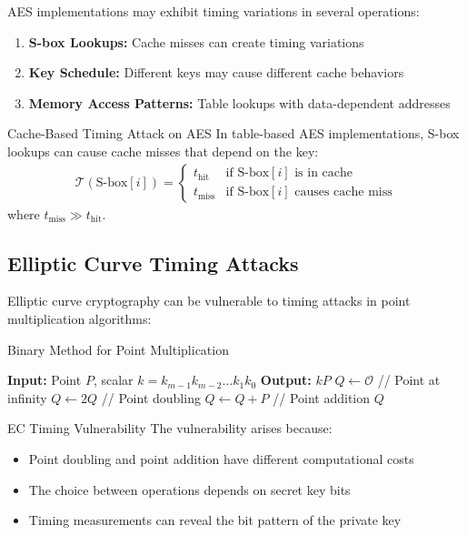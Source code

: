 \documentclass[12pt,a4paper]{article}
\theoremstyle{definition}
\newcommand{\time}[1]{\mathcal{T}\left(#1\right)}
\begin{document}
AES implementations may exhibit timing variations in several operations:

\begin{enumerate}
    \item \textbf{S-box Lookups:} Cache misses can create timing variations
    \item \textbf{Key Schedule:} Different keys may cause different cache behaviors
    \item \textbf{Memory Access Patterns:} Table lookups with data-dependent addresses
\end{enumerate}

\begin{definitionbox}{Cache-Based Timing Attack on AES}
In table-based AES implementations, S-box lookups can cause cache misses that depend on the key:
\begin{align}
\time{\text{S-box}[i]} = \begin{cases}
t_{\text{hit}} & \text{if S-box}[i] \text{ is in cache} \\
t_{\text{miss}} & \text{if S-box}[i] \text{ causes cache miss}
\end{cases}
\end{align}
where $t_{\text{miss}} \gg t_{\text{hit}}$.
\end{definitionbox}

\subsection{Elliptic Curve Timing Attacks}

Elliptic curve cryptography can be vulnerable to timing attacks in point multiplication algorithms:

\begin{algorithmbox}{Binary Method for Point Multiplication}
\begin{algorithmic}
\STATE \textbf{Input:} Point $P$, scalar $k = k_{m-1}k_{m-2}\ldots k_1k_0$
\STATE \textbf{Output:} $kP$
\STATE $Q \leftarrow \mathcal{O}$ \quad // Point at infinity
    \STATE $Q \leftarrow 2Q$ \quad // Point doubling
        \STATE $Q \leftarrow Q + P$ \quad // Point addition
    \ENDIF
\ENDFOR
\RETURN $Q$
\end{algorithmic}
\end{algorithmbox}

\begin{examplebox}{EC Timing Vulnerability}
The vulnerability arises because:
\begin{itemize}
    \item Point doubling and point addition have different computational costs
    \item The choice between operations depends on secret key bits
    \item Timing measurements can reveal the bit pattern of the private key
\end{itemize}
\end{examplebox}
\end{document}
